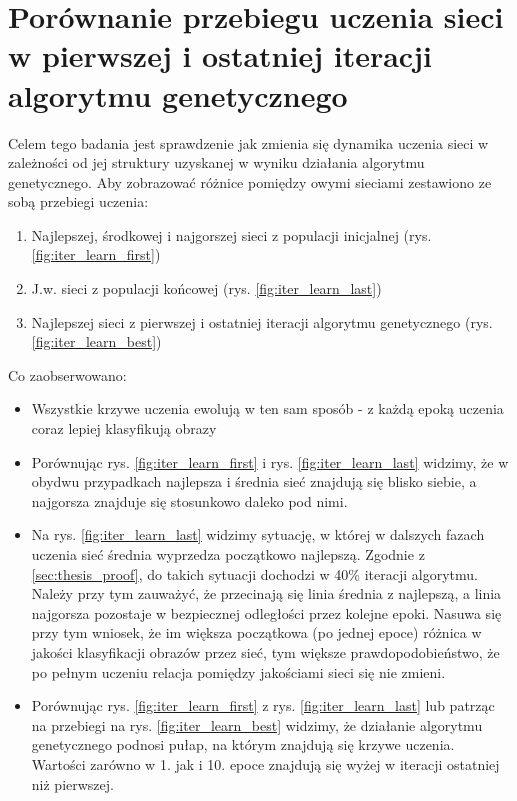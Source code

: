 \section{Porównanie przebiegu uczenia sieci w pierwszej i ostatniej iteracji algorytmu genetycznego}
Celem tego badania jest sprawdzenie jak zmienia się dynamika uczenia sieci w zależności od jej struktury uzyskanej w wyniku działania algorytmu genetycznego.
Aby zobrazować różnice pomiędzy owymi sieciami zestawiono ze sobą przebiegi uczenia:
\begin{enumerate}
  \item Najlepszej, środkowej i najgorszej sieci z populacji inicjalnej (rys. \ref{fig:iter_learn_first})
  \item J.w. sieci z populacji końcowej (rys. \ref{fig:iter_learn_last})
  \item Najlepszej sieci z pierwszej i ostatniej iteracji algorytmu genetycznego (rys. \ref{fig:iter_learn_best})
\end{enumerate}
Co zaobserwowano:
\begin{itemize}
  \item Wszystkie krzywe uczenia ewolują w ten sam sposób - z każdą epoką uczenia coraz lepiej klasyfikują obrazy
  \item Porównując rys. \ref{fig:iter_learn_first} i rys. \ref{fig:iter_learn_last} widzimy, że w obydwu przypadkach najlepsza i średnia sieć znajdują się blisko siebie, a najgorsza znajduje się stosunkowo daleko pod nimi.
  \item Na rys. \ref{fig:iter_learn_last} widzimy sytuację, w której w dalszych fazach uczenia sieć średnia wyprzedza początkowo najlepszą.
  Zgodnie z \ref{sec:thesis_proof}, do takich sytuacji dochodzi w 40\% iteracji algorytmu.
  Należy przy tym zauważyć, że przecinają się linia średnia z najlepszą, a linia najgorsza pozostaje w bezpiecznej odległości przez kolejne epoki.
  Nasuwa się przy tym wniosek, że im większa początkowa (po jednej epoce) różnica w jakości klasyfikacji obrazów przez sieć, tym większe prawdopodobieństwo, że po pełnym uczeniu relacja pomiędzy jakościami sieci się nie zmieni.
  \item Porównując rys. \ref{fig:iter_learn_first} z rys. \ref{fig:iter_learn_last} lub patrząc na przebiegi na rys. \ref{fig:iter_learn_best} widzimy, że działanie algorytmu genetycznego podnosi pułap, na którym znajdują się krzywe uczenia.
  Wartości zarówno w 1. jak i 10. epoce znajdują się wyżej w iteracji ostatniej niż pierwszej.

\end{itemize}

